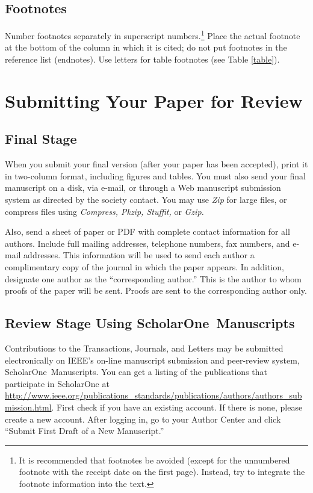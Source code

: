 \documentclass{IEEEtran}
\begin{document}
\subsection{Footnotes}
Number footnotes separately in superscript numbers.\footnote{It is recommended that footnotes be avoided (except for 
the unnumbered footnote with the receipt date on the first page). Instead, 
try to integrate the footnote information into the text.} Place the actual 
footnote at the bottom of the column in which it is cited; do not put 
footnotes in the reference list (endnotes). Use letters for table footnotes 
(see Table \ref{table}).

\section{Submitting Your Paper for Review}

\subsection{Final Stage}
When you submit your final version (after your paper has been accepted), 
print it in two-column format, including figures and tables. You must also 
send your final manuscript on a disk, via e-mail, or through a Web 
manuscript submission system as directed by the society contact. You may use 
\emph{Zip} for large files, or compress files using \emph{Compress, Pkzip, Stuffit,} or \emph{Gzip.} 

Also, send a sheet of paper or PDF with complete contact information for all 
authors. Include full mailing addresses, telephone numbers, fax numbers, and 
e-mail addresses. This information will be used to send each author a 
complimentary copy of the journal in which the paper appears. In addition, 
designate one author as the ``corresponding author.'' This is the author to 
whom proofs of the paper will be sent. Proofs are sent to the corresponding 
author only.

\subsection{Review Stage Using ScholarOne\textregistered\ Manuscripts}
Contributions to the Transactions, Journals, and Letters may be submitted 
electronically on IEEE's on-line manuscript submission and peer-review 
system, ScholarOne\textregistered\ Manuscripts. You can get a listing of the 
publications that participate in ScholarOne at 
\underline{http://www.ieee.org/publications\_standards/publications/}\discretionary{}{}{}\underline{authors/authors\_submission.html}.
First check if you have an existing account. If there is none, please create 
a new account. After logging in, go to your Author Center and click ``Submit 
First Draft of a New Manuscript.'' 
\end{document}
